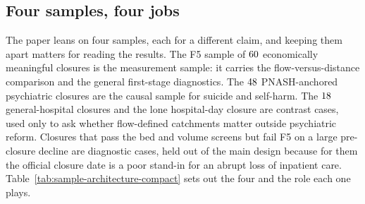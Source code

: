 \subsection{Four samples, four jobs}
\label{sec:setting-samples}

The paper leans on four samples, each for a different claim, and keeping
them apart matters for reading the results. The F5 sample of
$60$ economically meaningful closures is the measurement
sample: it carries the flow-versus-distance comparison and the general
first-stage diagnostics. The $48$ PNASH-anchored
psychiatric closures are the causal sample for suicide and self-harm. The
$18$ general-hospital closures and the lone hospital-day
closure are contrast cases, used only to ask whether flow-defined
catchments matter outside psychiatric reform. Closures that pass the bed
and volume screens but fail F5 on a large pre-closure decline are
diagnostic cases, held out of the main design because for them the
official closure date is a poor stand-in for an abrupt loss of inpatient care.
Table~\ref{tab:sample-architecture-compact} sets out the four and the
role each one plays.


